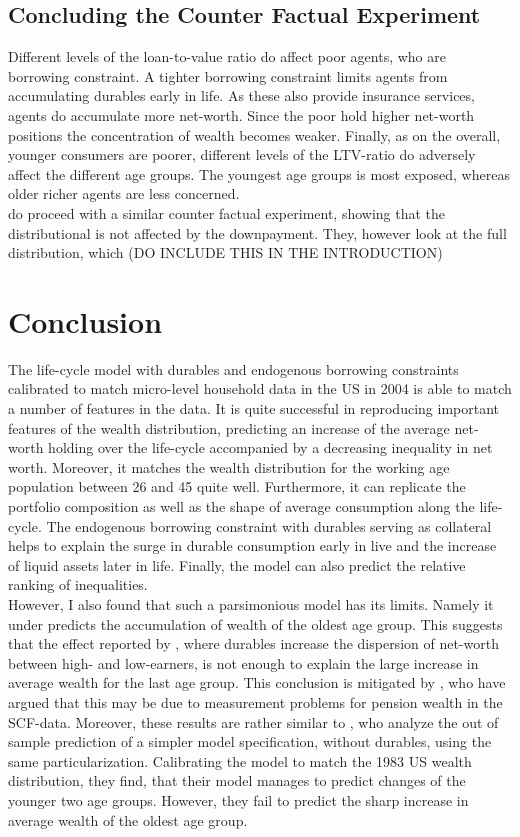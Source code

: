 \documentclass[a4paper,12pt,legno]{article}
\begin{document}
\subsection{Concluding the Counter Factual Experiment}
Different levels of the loan-to-value ratio do affect poor agents, who are borrowing constraint. A tighter borrowing constraint limits agents from accumulating durables early in life. As these also provide insurance services, agents do accumulate more net-worth. Since the poor hold higher net-worth positions the concentration of wealth becomes weaker. Finally, as on the overall, younger consumers are poorer, different levels of the LTV-ratio do adversely affect the different age groups. The youngest age groups is most exposed, whereas older richer agents are less concerned. \\
\cite{diaz2010} do proceed with a similar counter factual experiment, showing that the distributional is not affected by the downpayment. They, however look at the full distribution, which (DO INCLUDE THIS IN THE INTRODUCTION) 

\section{Conclusion}
The life-cycle model with durables and endogenous borrowing constraints calibrated to match micro-level household data in the US in 2004 is able to match a number of features in the data. It is quite successful in reproducing important features of the wealth distribution, predicting an increase of the average net-worth holding over the life-cycle accompanied by a decreasing inequality in net worth. Moreover, it matches the wealth distribution for the working age population between 26 and 45 quite well. Furthermore, it can replicate the portfolio composition as well as the shape of average consumption along the life-cycle. The endogenous borrowing constraint with durables serving as collateral helps to explain the surge in durable consumption early in live and the increase of liquid assets later in life. Finally, the model can also predict the relative ranking of inequalities. \\
However, I also found that such a parsimonious model has its limits. Namely it under predicts the accumulation of wealth of the oldest age group. This suggests that the effect reported by \citep{FV&K2011}, where durables increase the dispersion of net-worth between high- and low-earners, is not enough to explain the large increase in average wealth for the last age group. This conclusion is mitigated by \cite{hintermaier2011}, who have argued that this may be due to measurement problems for pension wealth in the SCF-data. Moreover, these results are rather similar to \cite{hintermaier2011}, who analyze the out of sample prediction of a simpler model specification, without durables, using the same particularization. Calibrating the model to match the 1983 US wealth distribution, they find, that their model manages to predict changes of the younger two age groups. However, they fail to predict the sharp increase in average wealth of the oldest age group. 
\end{document}
